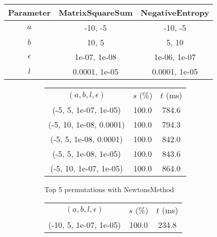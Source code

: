 \begin{center}
\label{tab:params_DichotomousSearch}
\begin{tabular}{|c|c|c|}
\hline
\rowcolor{gray!25}
Parameter & MatrixSquareSum & NegativeEntropy \\
\hline
$a$ & -10, -5 & -10, -5 \\
$b$ & 10, 5 & 5, 10 \\
$\epsilon$ & 1e-07, 1e-08 & 1e-06, 1e-07 \\
$l$ & 0.0001, 1e-05 & 0.0001, 1e-05 \\
\hline
\end{tabular}
\end{center}

\begin{figure}[H]
\label{fig:param_comp_MatrixSquareSum_DichotomousSearch}
\begin{subfigure}[ht]{.5\textwidth}
\begin{tabular}{|c|c|c|}
\hline
\rowcolor{gray!25}
\multicolumn{3}{|c|}{NewtonsMethod} \\
\hline
\rowcolor{gray!25}
$(a,b,l,\epsilon)$ & $s$ (\%) & $t$ (ms) \\
\hline
(-5, 5, 1e-07, 1e-05) & 100.0 & 784.6 \\
(-5, 10, 1e-08, 0.0001) & 100.0 & 794.3 \\
(-5, 5, 1e-08, 0.0001) & 100.0 & 842.0 \\
(-5, 5, 1e-08, 1e-05) & 100.0 & 843.6 \\
(-5, 10, 1e-07, 1e-05) & 100.0 & 864.0 \\
\hline
\end{tabular}
\caption{Top 5 permutations with NewtonsMethod}
\label{subfig:param_comp_MatrixSquareSum_NewtonsMethod_DichotomousSearch}
\end{subfigure}
\hfill
\begin{subfigure}[ht]{.5\textwidth}
\begin{tabular}{|c|c|c|}
\hline
\rowcolor{gray!25}
\multicolumn{3}{|c|}{GradientDescentMethod} \\
\hline
\rowcolor{gray!25}
$(a,b,l,\epsilon)$ & $s$ (\%) & $t$ (ms) \\
\hline
(-10, 5, 1e-07, 1e-05) & 100.0 & 234.8 \\

\end{tabular}
\end{subfigure}
\end{figure}
